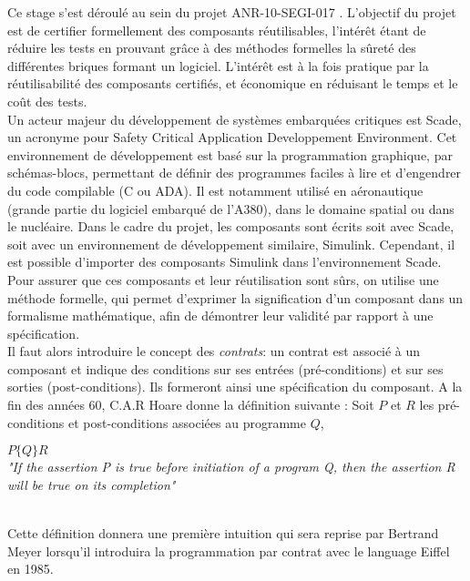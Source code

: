 


Ce stage s'est déroulé au sein du projet ANR-10-SEGI-017 \cercles\cite{Cercles}.
L'objectif du projet est de certifier formellement
des composants réutilisables, l'intérêt étant de réduire les tests en prouvant
grâce à des méthodes formelles la sûreté des différentes briques formant un
logiciel. L'intérêt est à la fois pratique par la réutilisabilité des composants
certifiés, et économique en réduisant le temps et le coût des tests. \\  

Un acteur majeur du développement de systèmes embarquées critiques est Scade,
un acronyme pour Safety Critical Application Developpement Environment. Cet
environnement de développement est basé sur la programmation graphique, par
schémas-blocs, permettant de définir des programmes faciles à lire et
d'engendrer du code compilable (C ou ADA). Il est 
notamment utilisé en aéronautique (grande partie du logiciel embarqué de
l'A380), dans le domaine spatial ou dans le nucléaire. Dans le cadre du projet,
les composants sont écrits soit avec Scade, soit avec un environnement de
développement similaire, Simulink. Cependant, il est possible d'importer des
composants Simulink dans l'environnement Scade. \\


Pour assurer que ces composants et leur réutilisation sont sûrs, on
utilise une méthode formelle, qui permet d'exprimer la signification d'un
composant dans un formalisme mathématique, afin de démontrer leur
validité par rapport à une spécification.\\
Il faut alors introduire le concept des \emph{contrats}: un contrat est
associé à un composant et indique des conditions sur ses entrées
(pré-conditions) et sur ses sorties (post-conditions). Ils formeront
ainsi une spécification du composant. 
A la fin des années 60, C.A.R Hoare donne la définition suivante \cite{Hoare} : Soit $P$ et
$R$ les pré-conditions et post-conditions associées au programme $Q$, \\
\begin{minipage}{\textwidth}
\begin{center}
$P\{Q\}R$ \\
\emph{"If the assertion P is true before initiation of a program Q, then the
assertion R will be true on its completion"}
\end{center}
\end{minipage}
\\
Cette définition donnera une première intuition qui sera reprise par Bertrand
Meyer lorsqu'il introduira la programmation par contrat avec le language Eiffel
en 1985.\\

